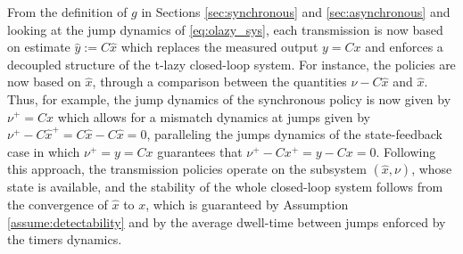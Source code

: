 \documentclass[twocolumn]{autart}
\begin{document}
 From the definition of $g$ in Sections
 \ref{sec:synchronous} and \ref{sec:asynchronous} and 
 looking at the jump dynamics of \eqref{eq:olazy_sys},
 each transmission is now based on estimate $\hat{y}:=C\hat{x}$ which replaces 
 the measured output $y=Cx$ and
 enforces a decoupled structure of the t-lazy closed-loop system. For instance, the policies 
 are now based on $\hat{x}$, through a comparison between the quantities $\nu-C\hat{x}$ and $\hat{x}$. 
 Thus, for example, the jump dynamics of the synchronous policy is now 
 given by $\nu^+= C\hat{x}$ which allows 
 for a mismatch dynamics at jumps given by 
 $\nu^+-C\hat{x}^+ = C\hat{x}-C\hat{x} =0$, paralleling the jumps dynamics of the 
 state-feedback case in which $\nu^+= y = Cx$ guarantees that $\nu^+ - Cx^+ = y-Cx=0$. Following this
 approach, the transmission policies operate on the subsystem $(\hat{x},\nu)$, whose state is available, 
 and the stability of the whole closed-loop system follows from the convergence of $\hat{x}$ to $x$,
 which is guaranteed by Assumption \ref{assume:detectability} and by the average dwell-time 
 between jumps enforced by the timers dynamics.
\end{document}
